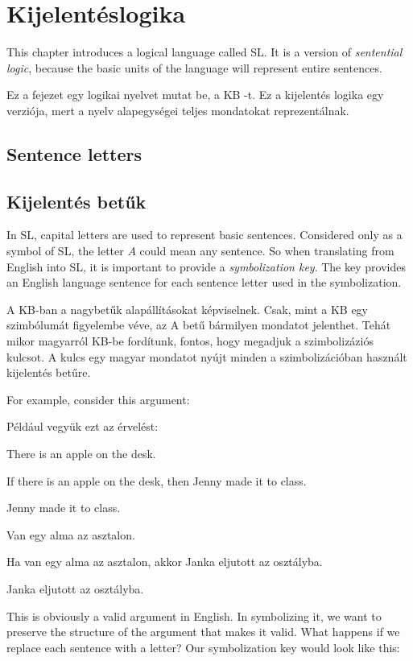
\chapter{Kijelentéslogika}
\label{ch.SL}


This chapter introduces a logical language called SL. It is a version of \emph{sentential logic}, because the basic units of the language will represent entire sentences.

Ez a fejezet egy logikai nyelvet mutat be, a KB -t. Ez a kijelentés logika egy verziója, mert a nyelv alapegységei teljes mondatokat reprezentálnak.


\section{Sentence letters}

\section{Kijelentés betűk}
In SL, capital letters are used to represent basic sentences. Considered only as a symbol of SL, the letter $A$ could mean any sentence. So when translating from English into SL, it is important to provide a \emph{symbolization key}. The key provides an English language sentence for each sentence letter used in the symbolization.

A KB-ban a nagybetűk alapállításokat képviselnek. Csak, mint a KB egy szimbólumát figyelembe véve, az A betű bármilyen mondatot jelenthet. Tehát mikor magyarról KB-be fordítunk, fontos, hogy megadjuk a szimbolizáziós kulcsot. A kulcs egy magyar mondatot nyújt minden a szimbolizációban használt kijelentés betűre.

For example, consider this argument:

Például vegyük ezt az érvelést:
\begin{earg}
\item[] There is an apple on the desk.
\item[] If there is an apple on the desk, then Jenny made it to class.
\item[\therefore] Jenny made it to class.
\end{earg}

\begin{earg}
\item[] Van egy alma az asztalon.
\item[] Ha van egy alma az asztalon, akkor Janka eljutott az osztályba.
\item[\therefore] Janka eljutott az osztályba.
\end{earg}
This is obviously a valid argument in English. In symbolizing it, we want to preserve the structure of the argument that makes it valid.
What happens if we replace each sentence with a letter? Our symbolization key would look like this:

